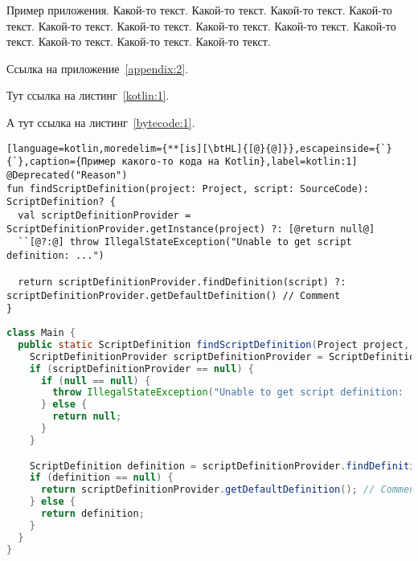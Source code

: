 Пример приложения. Какой-то текст. Какой-то текст. Какой-то текст. Какой-то текст. Какой-то текст. Какой-то текст. Какой-то текст. Какой-то текст. Какой-то текст. Какой-то текст. Какой-то текст. Какой-то текст.

Ссылка на приложение~\ref{appendix:2}.

Тут ссылка на листинг~\ref{kotlin:1}.

А тут ссылка на листинг~\ref{bytecode:1}.

\begin{lstlisting}[language=kotlin,moredelim={**[is][\btHL]{[@}{@]}},escapeinside={`}{`},caption={Пример какого-то кода на Kotlin},label=kotlin:1]
@Deprecated("Reason")
fun findScriptDefinition(project: Project, script: SourceCode): ScriptDefinition? {
  val scriptDefinitionProvider = ScriptDefinitionProvider.getInstance(project) ?: [@return null@]
  ``[@?:@] throw IllegalStateException("Unable to get script definition: ...")

  return scriptDefinitionProvider.findDefinition(script) ?: scriptDefinitionProvider.getDefaultDefinition() // Comment
}
\end{lstlisting}

\begin{lstlisting}[language=java,caption={Пример какого-то кода на Java},label=java:1]
class Main {
  public static ScriptDefinition findScriptDefinition(Project project, SourceCode script) {
    ScriptDefinitionProvider scriptDefinitionProvider = ScriptDefinitionProvider.getInstance(project);
    if (scriptDefinitionProvider == null) {
      if (null == null) {
        throw IllegalStateException("Unable to get script definition: ...");
      } else {
        return null;
      }
    }

    ScriptDefinition definition = scriptDefinitionProvider.findDefinition(script);
    if (definition == null) {
      return scriptDefinitionProvider.getDefaultDefinition(); // Comment
    } else {
      return definition;
    }
  }
}
\end{lstlisting}

\newcommand{\createlinenumber}[2]{
    \edef\thelstnumber{%
        \unexpanded{%
            \ifnum#1=\value{lstnumber}\relax
              #2%
            \fi%
        }%
        \ifx\thelstnumber\relax%
        \else\expandafter\unexpanded\expandafter{\thelstnumber}%
        \fi%
    }
}

\bgroup
\let\thelstnumber\relax
\createlinenumber{2}{13}
\createlinenumber{3}{14}
\createlinenumber{4}{15}
\createlinenumber{5}{18}
\createlinenumber{6}{21}
\createlinenumber{7}{22}
\createlinenumber{8}{24}
\createlinenumber{9}{27}

